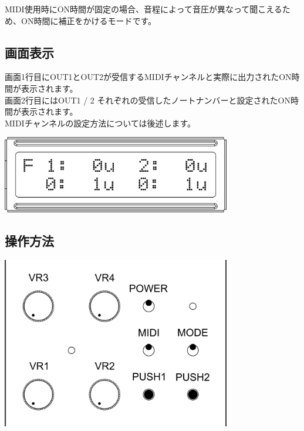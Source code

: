 \documentclass[a4paper,11pt]{jsarticle}
\begin{document}
MIDI使用時にON時間が固定の場合、音程によって音圧が異なって聞こえるため、ON時間に補正をかけるモードです。

\subsection{画面表示}

画面1行目にOUT1とOUT2が受信するMIDIチャンネルと実際に出力されたON時間が表示されます。 \\
画面2行目にはOUT1 / 2 それぞれの受信したノートナンバーと設定されたON時間が表示されます。 \\
MIDIチャンネルの設定方法については後述します。

\vspace*{5mm}
\begin{center}
\includegraphics[width=100mm]{image/Arduino_Interrupter_v1_LCD_MIDI_FIX.png}
\end{center}
\vspace*{5mm}

\subsection{操作方法}

\vspace*{5mm}
\begin{center}
\includegraphics[width=100mm]{image/Arduino_Interrupter_v1_Design_MIDI_FIX.png}
\end{center}
\vspace*{5mm}
\end{document}
